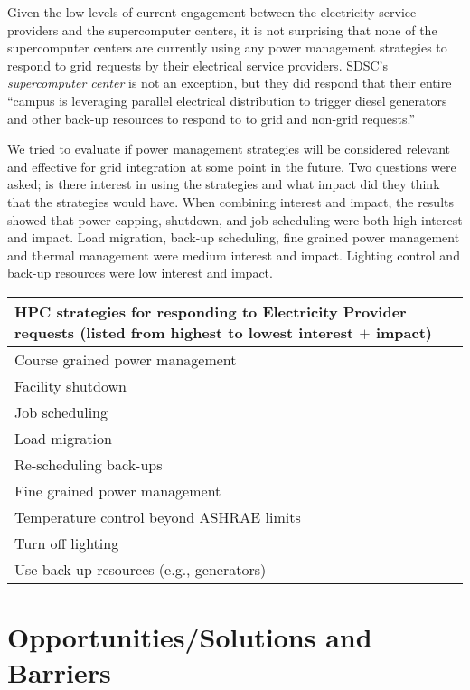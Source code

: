 \documentclass{llncs}
\begin{document}
Given the low levels of current engagement between the electricity service
providers and the supercomputer centers, it is not surprising that none of
the supercomputer centers are currently using any power management
strategies to respond to grid requests by their electrical service
providers. SDSC's \textit{supercomputer center} is not an exception, but they did respond that their
entire ``campus is leveraging parallel electrical distribution to trigger
diesel generators and other back-up resources to respond to to grid and
non-grid requests.''

We tried to evaluate if power management strategies will be considered
relevant and effective for grid integration at some point in the future. Two
questions were asked; is there interest in using the strategies and what
impact did they think that the strategies would have. When combining
interest and impact, the results showed that power capping, shutdown, and
job scheduling were both high interest and impact. Load migration, back-up
scheduling, fine grained power management and thermal management were medium
interest and impact. Lighting control and back-up resources were low
interest and impact.


\begin{table}[htbp]
\begin{center}
\begin{tabular}{|p{299pt}|}
\hline
\textbf{HPC strategies for responding to Electricity Provider requests (listed from highest to lowest interest }$+$\textbf{ impact)} \\
\hline
Course grained power management \\
\hline
Facility shutdown \\
\hline
Job scheduling \\
\hline
Load migration \\
\hline
Re-scheduling back-ups \\
\hline
Fine grained power management \\
\hline
Temperature control beyond ASHRAE limits \\
\hline
Turn off lighting \\
\hline
Use back-up resources (e.g., generators) \\
\hline
\end{tabular}
\label{tab1}
\end{center}
\end{table}



\section{Opportunities/Solutions and Barriers} 
\end{document}
